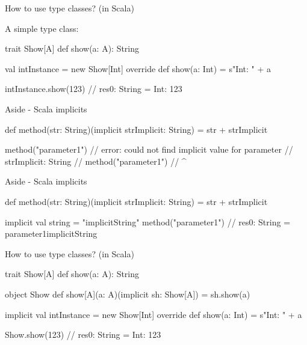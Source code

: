 \documentclass[13pt]{beamer}
\begin{document}
\begin{frame}[fragile]{How to use type classes? (in Scala)}
  \note {
  }

  A simple type class:
  \begin{scalaCode}
    trait Show[A] {
      def show(a: A): String
    }

    val intInstance = new Show[Int] {
      override def show(a: Int) = s"Int: " + a
    }

    intInstance.show(123)
    // res0: String = Int: 123
    
  \end{scalaCode}
\end{frame}

\begin{frame}[fragile]{Aside - Scala implicits}
  \note {
  }

  \begin{scalaCode}
    def method(str: String)(implicit strImplicit: String) =
      str + strImplicit
    
    method("parameter1")
    // error: could not find implicit value for parameter
    // strImplicit: String
    // method("parameter1")
    // ^
    
  \end{scalaCode}
\end{frame}

\begin{frame}[fragile]{Aside - Scala implicits}
  \note {
  }

  \begin{scalaCode}
    def method(str: String)(implicit strImplicit: String) =
      str + strImplicit
    
    implicit val string = "implicitString"
    method("parameter1")
    // res0: String = parameter1implicitString
    
  \end{scalaCode}
\end{frame}

\begin{frame}[fragile]{How to use type classes? (in Scala)}
  \note {
  }

  \begin{scalaCode}
    trait Show[A] {
      def show(a: A): String
    }

    object Show {
      def show[A](a: A)(implicit sh: Show[A]) = sh.show(a)
    }

    implicit val intInstance = new Show[Int] {
      override def show(a: Int) = s"Int: " + a
    }

    Show.show(123)
    // res0: String = Int: 123
  \end{scalaCode}
\end{frame}
\end{document}
